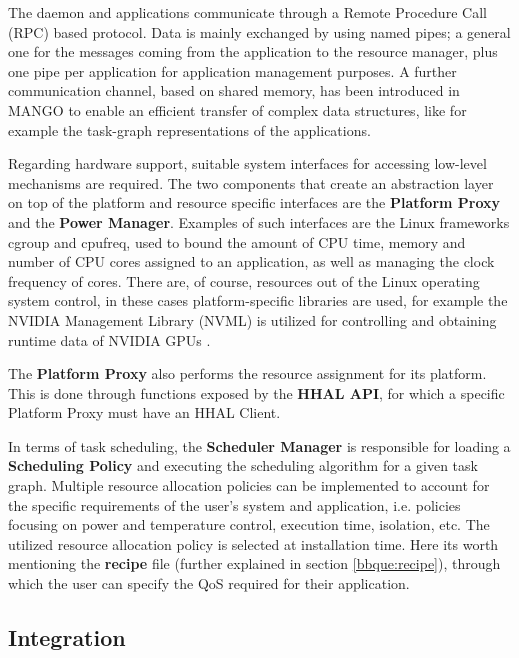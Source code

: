 The daemon and applications communicate through a Remote Procedure Call (RPC) based protocol. Data is mainly exchanged by using named pipes; a general one for the messages coming from the application to the resource manager, plus one pipe per application for application management purposes. A further communication channel, based on shared memory, has been introduced in MANGO to enable an efficient transfer of complex data structures, like for example the task-graph representations of the applications. 

Regarding hardware support, suitable system interfaces for accessing low-level mechanisms are required. The two components that create an abstraction layer on top of the platform and resource specific interfaces are the \textbf{Platform Proxy} and the \textbf{Power Manager}. Examples of such interfaces are the Linux frameworks cgroup and cpufreq, used to bound the amount of CPU time, memory and number of CPU cores assigned to an application, as well as managing the clock frequency of cores.
There are, of course, resources out of the Linux operating system control, in these cases platform-specific libraries are used, for example the NVIDIA Management Library (NVML) \cite{nvml} is utilized for controlling and obtaining runtime data of NVIDIA GPUs \cite{mango_exploring_manycore_architectures}.

The \textbf{Platform Proxy} also performs the resource assignment for its platform. This is done through functions exposed by the \textbf{HHAL API}, for which a specific Platform Proxy must have an HHAL Client.

In terms of task scheduling, the \textbf{Scheduler Manager} is responsible for loading a \textbf{Scheduling Policy} and executing the scheduling algorithm for a given task graph. Multiple resource allocation policies can be implemented to account for the specific requirements of the user's system and application, i.e. policies focusing on power and temperature control, execution time, isolation\cite{mango_exploring_manycore_architectures}, etc. The utilized resource allocation policy is selected at installation time. 
Here its worth mentioning the \textbf{recipe} file (further explained in section \ref{bbque:recipe}), through which the user can specify the QoS required for their application.

\subsection{Integration}

